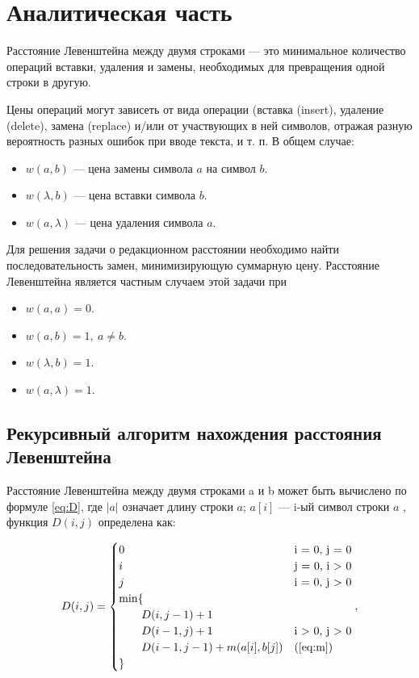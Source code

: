 \chapter{Аналитическая часть}
Расстояние Левенштейна \cite{Lev} между двумя строками — это минимальное количество операций вставки,
удаления и замены, необходимых для превращения одной строки в другую.

Цены операций могут зависеть от вида операции (вставка (insert), удаление (delete), замена (replace)
и/или от участвующих в ней символов, отражая разную вероятность разных ошибок при вводе текста, и т. п. В общем случае:

\begin{itemize}
    \item $w(a,b)$ — цена замены символа $a$ на символ $b$.
    \item $w(\lambda,b)$ — цена вставки символа $b$.
    \item $w(a,\lambda)$ — цена удаления символа $a$.
\end{itemize}

Для решения задачи о редакционном расстоянии необходимо найти последовательность замен, минимизирующую суммарную цену.
Расстояние Левенштейна является частным случаем этой задачи при

\begin{itemize}
    \item $w(a,a)=0$.
    \item $w(a,b)=1, \medspace a \neq b$.
    \item $w(\lambda,b)=1$.
    \item $w(a,\lambda)=1$.
\end{itemize}

\section{Рекурсивный алгоритм нахождения расстояния Левенштейна}

Расстояние Левенштейна между двумя строками a и b может быть вычислено по формуле \eqref{eq:D},
где $|a|$ означает длину строки $a$; $a[i]$ — i-ый символ строки $a$ , функция $D(i, j)$ определена как:

\begin{equation}
    \label{eq:D}
    D(i, j) = \begin{cases}
                  0 &\text{i = 0, j = 0}\\
                  i &\text{j = 0, i > 0}\\
                  j &\text{i = 0, j > 0}\\
                  \min \lbrace \\
                  \qquad D(i, j-1) + 1\\
                  \qquad D(i-1, j) + 1 &\text{i > 0, j > 0}\\
                  \qquad D(i-1, j-1) + m(a[i], b[j]) &\text(\eqref{eq:m})\\
                  \rbrace
    \end{cases},
\end{equation}

